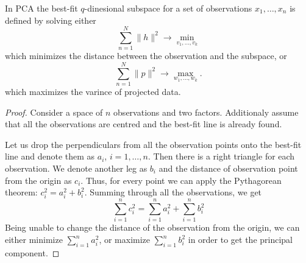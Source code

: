 \begin{theorem}
In PCA the best-fit $q$-dinesional subspace for a set of observations $x_1, \ldots, x_n$
is defined by solving either
\[
\sum_{n=1}^N \lVert h \rVert^2  \to \min_{v_1, \ldots, v_k}
\]
which minimizes the distance between the observation and the subspace, or
\[
\sum_{n=1}^N \lVert p \rVert^2  \to \max_{w_1, \ldots, w_k}.
\]
which maximizes the varince of projected data.
\end{theorem}

\begin{proof}
Consider a space of $n$ observations and two factors.
Additionaly assume that all the observations are centred and
the best-fit line is already found.

Let us drop the perpendiculars from all the observation points onto the best-fit line
and denote them as $a_i$, $i = 1, \ldots, n$.
Then there is a right triangle for each observation.
We denote another leg as $b_i$ and the distance of observation point from the origin as $c_i$.
Thus, for every point we can apply the Pythagorean theorem: $c_i^2 = a_i^2 + b_i^2$.
Summing through all the observations, we get
\[
\sum\limits_{i=1}^n c_i^2 = \sum\limits_{i=1}^n a_i^2 + \sum\limits_{i=1}^n b_i^2
\]
Being unable to change the distance of the observation from the origin,
we can either minimize $\sum_{i=1}^n a_i^2$, or maximize $\sum_{i=1}^n b_i^2$
in order to get the principal component.


\end{proof}
